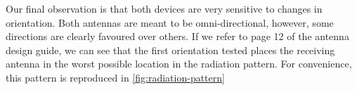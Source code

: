 Our final observation is that both devices are very sensitive to changes in
orientation. Both antennas are meant to be omni-directional, however, some
directions are clearly favoured over others. If we refer to page 12 of the
antenna design guide\citep{AN3359}, we can see that the first orientation tested
places the receiving antenna in the worst possible location in the radiation
pattern. For convenience, this pattern is reproduced in
\autoref{fig:radiation-pattern}
